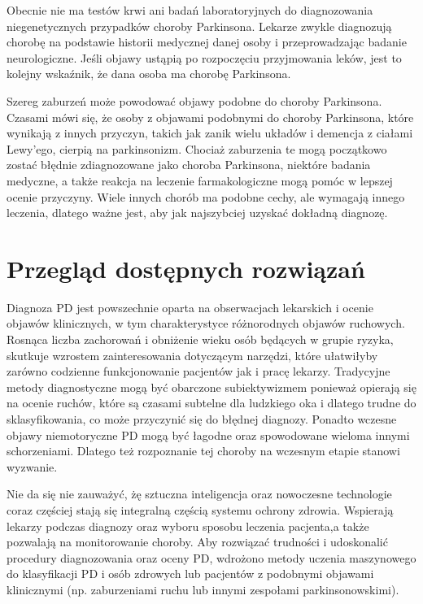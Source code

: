 Obecnie nie ma testów krwi ani badań laboratoryjnych do diagnozowania niegenetycznych przypadków choroby Parkinsona.
Lekarze zwykle diagnozują chorobę na podstawie historii medycznej danej osoby i przeprowadzając badanie neurologiczne.
Jeśli objawy ustąpią po rozpoczęciu przyjmowania leków, jest to kolejny wskaźnik, że dana osoba ma chorobę Parkinsona\cite{National_Institute_on_Aging_2022}.

Szereg zaburzeń może powodować objawy podobne do choroby Parkinsona.
Czasami mówi się, że osoby z objawami podobnymi do choroby Parkinsona, które wynikają z innych przyczyn, takich jak zanik wielu układów i demencja z ciałami Lewy'ego, cierpią na parkinsonizm.
Chociaż zaburzenia te mogą początkowo zostać błędnie zdiagnozowane jako choroba Parkinsona, niektóre badania medyczne, a także reakcja na leczenie farmakologiczne mogą pomóc w lepszej ocenie przyczyny.
Wiele innych chorób ma podobne cechy, ale wymagają innego leczenia, dlatego ważne jest, aby jak najszybciej uzyskać dokładną diagnozę\cite{National_Institute_on_Aging_2022}.









\section{Przegląd dostępnych rozwiązań}
\label{sec:przeglad}

Diagnoza PD jest powszechnie oparta na obserwacjach lekarskich i ocenie objawów klinicznych, w tym charakterystyce różnorodnych objawów ruchowych.
Rosnąca liczba zachorowań i obniżenie wieku osób będących w grupie ryzyka, skutkuje wzrostem zainteresowania dotyczącym narzędzi, które ułatwiłyby
zarówno codzienne funkcjonowanie pacjentów jak i pracę lekarzy.
Tradycyjne metody diagnostyczne mogą być obarczone subiektywizmem ponieważ opierają się na ocenie ruchów, które są czasami subtelne dla
ludzkiego oka i dlatego trudne do sklasyfikowania, co może przyczynić się do błędnej diagnozy.
Ponadto wczesne objawy niemotoryczne PD mogą być łagodne oraz spowodowane wieloma innymi schorzeniami.
Dlatego też rozpoznanie tej choroby na wczesnym etapie stanowi wyzwanie.

Nie da się nie zauważyć, żę sztuczna inteligencja oraz nowoczesne technologie coraz częściej stają się integralną częścią systemu ochrony zdrowia.
Wspierają lekarzy podczas diagnozy oraz wyboru sposobu leczenia pacjenta,a także pozwalają na monitorowanie choroby.
Aby rozwiązać trudności i udoskonalić procedury diagnozowania oraz oceny PD, wdrożono metody uczenia maszynowego do klasyfikacji PD i osób zdrowych lub
pacjentów z podobnymi objawami klinicznymi (np. zaburzeniami ruchu lub innymi zespołami parkinsonowskimi).



